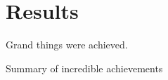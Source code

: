 \chapter{Results}

Grand things were achieved.

\begin{table}
\caption{Summary of incredible achievements}
\end{table}
